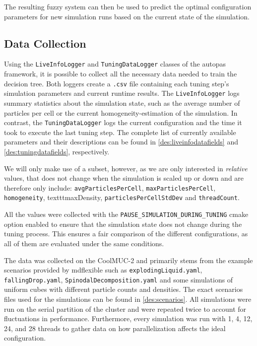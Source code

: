 The resulting fuzzy system can then be used to predict the optimal configuration parameters for new simulation runs based on the current state of the simulation.

\subsection{Data Collection}

Using the \texttt{LiveInfoLogger} and \texttt{TuningDataLogger} classes of the \gls{autopas} framework, it is possible to collect all the necessary data needed to train the decision tree. Both loggers create a \texttt{.csv} file containing each tuning step's simulation parameters and current runtime results. The \texttt{LiveInfoLogger} logs summary statistics about the simulation state, such as the average number of particles per cell or the current homogeneity-estimation of the simulation. In contrast, the \texttt{TuningDataLogger} logs the current configuration and the time it took to execute the last tuning step. The complete list of currently available parameters and their descriptions can be found in \autoref{des:liveinfodatafields} and \autoref{des:tuningdatafields}, respectively.

We will only make use of a subset, however, as we are only interested in \emph{relative} values, that does not change when the simulation is scaled up or down and are therefore only include:  \texttt{avgParticlesPerCell}, \texttt{maxParticlesPerCell}, \texttt{homogeneity}, texttt{maxDensity}, \texttt{particlesPerCellStdDev} and \texttt{threadCount}.

All the values were collected with the \texttt{PAUSE\_SIMULATION\_DURING\_TUNING} cmake option enabled to ensure that the simulation state does not change during the tuning process. This ensures a fair comparison of the different configurations, as all of them are evaluated under the same conditions.

The data was collected on the CoolMUC-2  and primarily stems from the example scenarios provided by \gls{mdflexible} such as \texttt{explodingLiquid.yaml}, \texttt{fallingDrop.yaml}, \texttt{SpinodalDecomposition.yaml} and some simulations of uniform cubes with different particle counts and densities. The exact scenarios files used for the simulations can be found in \autoref{des:scenarios}.
All simulations were run on the serial partition of the cluster and were repeated twice to account for fluctuations in performance. Furthermore, every simulation was run with 1, 4, 12, 24, and 28 threads to gather data on how parallelization affects the ideal configuration.

